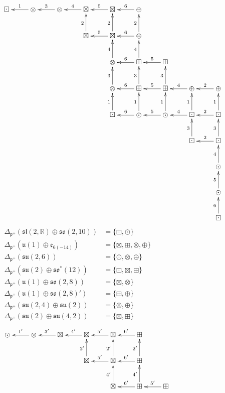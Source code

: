 \documentclass[pdftex]{sigma}
\numberwithin{equation}{section}
\newcommand{\BR}{\mathbb{R}}
\newcommand{\fp}{\mathfrak{p}}
\begin{document}
\begin{figure}[pt!]
\begin{gather*} \xymatrix{\boxdot&\otimes\ar[l]_1&\otimes\ar[l]_3&\boxtimes\ar[l]_4&\boxtimes\ar[l]_5&\oplus\ar[l]_6&&& \\
&&&\boxtimes\ar[u]^2&\boxtimes\ar[u]^2\ar[l]_5&\oplus\ar[u]^2\ar[l]_6&&& \\
&&&&\otimes\ar[u]^4&\boxplus\ar[u]^4\ar[l]_6&\boxplus\ar[l]_5&& \\
&&&&\otimes\ar[u]^3&\boxplus\ar[u]^3\ar[l]_6&\boxplus\ar[u]^3\ar[l]_5&\oplus\ar[l]_4&\oplus\ar[l]_2 \\
&&&&\boxdot\ar[u]^1&\odot\ar[u]^1\ar[l]_6&\odot\ar[u]^1\ar[l]_5&\boxdot\ar[u]^1\ar[l]_4&\boxdot\ar[u]^1\ar[l]_2 \\
&&&&&&&\boxdot\ar[u]^3&\boxdot\ar[u]^3\ar[l]_2 \\
&&&&&&&&\odot\ar[u]^4 \\ &&&&&&&&\odot\ar[u]^5 \\ &&&&&&&&\boxdot\ar[u]^6} \end{gather*}
\vspace{-160pt}
\begin{align*}
\Delta_{\fp^+}(\mathfrak{sl}(2,\BR)\oplus\mathfrak{so}(2,10))&=\{\boxdot,\odot\}\hspace{140pt}\\
\Delta_{\fp^+}(\mathfrak{u}(1)\oplus\mathfrak{e}_{6(-14)})&=\{\boxtimes,\boxplus,\otimes,\oplus\}\\
\Delta_{\fp^+}(\mathfrak{su}(2,6))&=\{\odot,\otimes,\oplus\}\\
\Delta_{\fp^+}(\mathfrak{su}(2)\oplus\mathfrak{so}^*(12))&=\{\boxdot,\boxtimes,\boxplus\}\\
\Delta_{\fp^+}(\mathfrak{u}(1)\oplus\mathfrak{so}(2,8))&=\{\boxtimes,\otimes\}\\
\Delta_{\fp^+}(\mathfrak{u}(1)\oplus\mathfrak{so}(2,8)')&=\{\boxplus,\oplus\}\\
\Delta_{\fp^+}(\mathfrak{su}(2,4)\oplus\mathfrak{su}(2))&=\{\otimes,\oplus\}\\
\Delta_{\fp^+}(\mathfrak{su}(2)\oplus\mathfrak{su}(4,2))&=\{\boxtimes,\boxplus\}
\end{align*}
\begin{gather*} \xymatrix{\odot&\otimes\ar[l]_{1'}&\boxtimes\ar[l]_{3'}&\boxtimes\ar[l]_{4'}&\boxtimes\ar[l]_{5'}&\boxplus\ar[l]_{6'}&&& \\
&&&\boxtimes\ar[u]^{2'}&\boxtimes\ar[u]^{2'}\ar[l]_{5'}&\boxplus\ar[u]^{2'}\ar[l]_{6'}&&& \\
&&&&\boxtimes\ar[u]^{4'}&\boxplus\ar[u]^{4'}\ar[l]_{6'}&\boxplus\ar[l]_{5'}&& \\
}
\end{gather*}
\end{figure}
\end{document}
